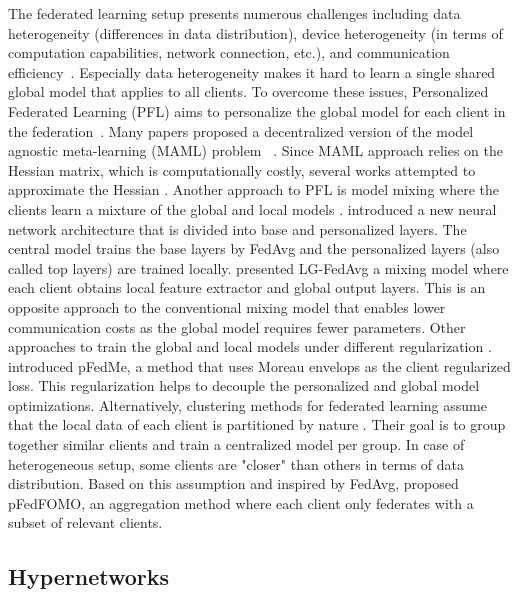 \documentclass{article}
\begin{document}
The federated learning setup presents numerous challenges including data heterogeneity (differences in data distribution), device heterogeneity (in terms of computation capabilities, network connection, etc.), and communication efficiency~\citep{kairouz2019advances}.
Especially data heterogeneity makes it hard to learn a single shared global model that applies to all clients. To overcome these issues, Personalized Federated Learning (PFL) aims to personalize the global model for each client in the federation~\citep{Kulkarni2020SurveyOP}.
Many papers proposed a decentralized version of the model agnostic meta-learning (MAML) problem 
~\citep{Fallah2020PersonalizedFL, li2017meta, behl2019alpha, zhou2019efficient, fallah2020convergence}. Since MAML approach relies on the Hessian matrix, which is computationally costly, several works attempted to approximate the Hessian \citep{finn2017model, nichol2018first}. Another approach to PFL is model mixing where the clients learn a mixture of the global and local models \citep{deng2020adaptive, arivazhagan2019federated}.
\citet{hanzely2020federated} introduced a new neural network architecture that is divided into base and personalized layers. The central model trains the base layers by FedAvg and the personalized layers (also called top layers) are trained locally.
\citet{liang2020think} presented LG-FedAvg a mixing model where each client obtains local feature extractor and global output layers. This is an opposite approach to the conventional mixing model that enables lower communication costs as the global model requires fewer parameters. Other approaches to train the global and local models under different regularization \citep{Huang2020PersonalizedCF}. \citet{Dinh2020PersonalizedFL} introduced pFedMe, a method that uses Moreau envelops as the client regularized loss. This regularization helps to decouple the personalized and global model optimizations.  
Alternatively, clustering methods for federated learning assume that the local data of each client is partitioned by nature \citep{Mansour2020ThreeAF}. Their goal is to group together similar clients and train a centralized model per group. In case of heterogeneous setup, some clients are "closer" than others in terms of data distribution. Based on this assumption and inspired by FedAvg, \citet{zhang2020personalized} proposed pFedFOMO, an aggregation method where each client only federates with a subset of relevant clients.

\subsection{Hypernetworks}
\end{document}
